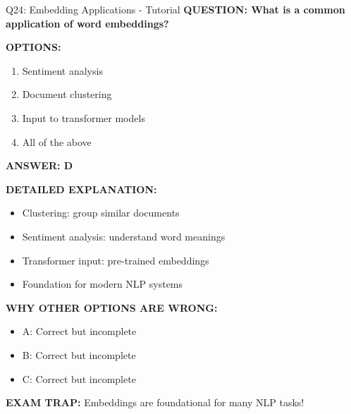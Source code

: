 \documentclass[8pt]{beamer}
\begin{document}
	\begin{frame}{Q24: Embedding Applications - Tutorial}
		\fontsize{6.5}{7.5}\selectfont
		\textbf{QUESTION: What is a common application of word embeddings?}
		
		\vspace{0.1cm}
		\textbf{OPTIONS:}
		\begin{enumerate}
			\item Sentiment analysis
			\item Document clustering
			\item Input to transformer models
			\item All of the above
		\end{enumerate}
		
		\vspace{0.1cm}
		\textcolor{myblue}{\textbf{ANSWER: D}}
		
		\vspace{0.1cm}
		\textbf{DETAILED EXPLANATION:}
		\begin{itemize}
			\item Clustering: group similar documents
			\item Sentiment analysis: understand word meanings
			\item Transformer input: pre-trained embeddings
			\item Foundation for modern NLP systems
		\end{itemize}
		
		\vspace{0.1cm}
		\textcolor{myred}{\textbf{WHY OTHER OPTIONS ARE WRONG:}}
		\begin{itemize}
			\item \textcolor{myred}{A:} Correct but incomplete
			\item \textcolor{myred}{B:} Correct but incomplete
			\item \textcolor{myred}{C:} Correct but incomplete
		\end{itemize}
		
		\textcolor{myred}{\textbf{EXAM TRAP:}} Embeddings are \textcolor{myblue}{foundational} for many NLP tasks!
	\end{frame}
	
\end{document}
